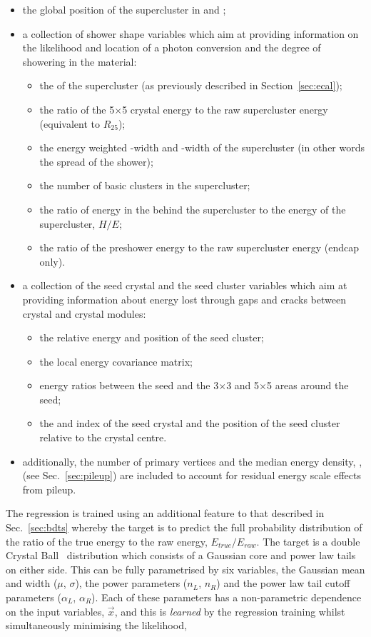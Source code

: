\begin{itemize}
  \item the global position of the supercluster in \eta and \phi;
  \item a collection of shower shape variables which aim at providing information on the likelihood and location of a photon conversion and the degree of showering in the material:
  \begin{itemize}
    \item the \rnine of the supercluster (as previously described in Section~\ref{sec:ecal});
    \item the ratio of the 5$\times$5 crystal energy to the raw supercluster energy (equivalent to $R_{25}$);
    \item the energy weighted \eta-width and \phi-width of the supercluster (in other words the spread of the shower);
    \item the number of basic clusters in the supercluster;
    \item the ratio of energy in the \HCAL behind the supercluster to the \ECAL energy of the supercluster, $H/E$;
    \item the ratio of the preshower energy to the raw supercluster energy (endcap only).
  \end{itemize}
  \item a collection of the seed crystal and the seed cluster variables which aim at providing information about energy lost through gaps and cracks between crystal and crystal modules:
  \begin{itemize}
    \item the relative energy and position of the seed cluster;
    \item the local energy covariance matrix;
    \item energy ratios between the seed and the 3$\times$3 and 5$\times$5 areas around the seed;
    \item the \eta and \phi index of the seed crystal and the position of the seed cluster relative to the crystal centre. 
  \end{itemize}
  \item additionally, the number of primary vertices and the median energy density, \rho, (see Sec.~\ref{sec:pileup}) are included to account for residual energy scale effects from pileup.
\end{itemize}
The regression is trained using an additional feature to that described in Sec.~\ref{sec:bdts} whereby the target is to predict the full probability distribution of the ratio of the true energy to the raw energy, $E_{true}/E_{raw}$. The target is a double Crystal Ball~\cite{CrystalBallShape} distribution which consists of a Gaussian core and power law tails on either side. This can be fully parametrised by six variables, the Gaussian mean and width ($\mu$, $\sigma$), the power parameters ($n_{L}$, $n_{R}$) and the power law tail cutoff parameters ($\alpha_{L}$, $\alpha_{R}$). Each of these parameters has a non-parametric dependence on the input variables, $\vec{x}$, and this is \emph{learned} by the regression training whilst simultaneously minimising the likelihood,
